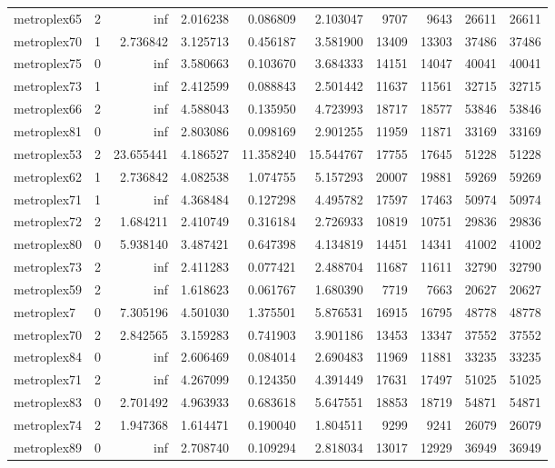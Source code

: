 \begin{longtable}{|l|r|r|r|r|r|r|r|r|r|}
metroplex65 & 2 & inf & 2.016238 & 0.086809 & 2.103047 & 9707 & 9643 & 26611 & 26611 \\
metroplex70 & 1 & 2.736842 & 3.125713 & 0.456187 & 3.581900 & 13409 & 13303 & 37486 & 37486 \\
metroplex75 & 0 & inf & 3.580663 & 0.103670 & 3.684333 & 14151 & 14047 & 40041 & 40041 \\
metroplex73 & 1 & inf & 2.412599 & 0.088843 & 2.501442 & 11637 & 11561 & 32715 & 32715 \\
metroplex66 & 2 & inf & 4.588043 & 0.135950 & 4.723993 & 18717 & 18577 & 53846 & 53846 \\
metroplex81 & 0 & inf & 2.803086 & 0.098169 & 2.901255 & 11959 & 11871 & 33169 & 33169 \\
metroplex53 & 2 & 23.655441 & 4.186527 & 11.358240 & 15.544767 & 17755 & 17645 & 51228 & 51228 \\
metroplex62 & 1 & 2.736842 & 4.082538 & 1.074755 & 5.157293 & 20007 & 19881 & 59269 & 59269 \\
metroplex71 & 1 & inf & 4.368484 & 0.127298 & 4.495782 & 17597 & 17463 & 50974 & 50974 \\
metroplex72 & 2 & 1.684211 & 2.410749 & 0.316184 & 2.726933 & 10819 & 10751 & 29836 & 29836 \\
metroplex80 & 0 & 5.938140 & 3.487421 & 0.647398 & 4.134819 & 14451 & 14341 & 41002 & 41002 \\
metroplex73 & 2 & inf & 2.411283 & 0.077421 & 2.488704 & 11687 & 11611 & 32790 & 32790 \\
metroplex59 & 2 & inf & 1.618623 & 0.061767 & 1.680390 & 7719 & 7663 & 20627 & 20627 \\
metroplex7 & 0 & 7.305196 & 4.501030 & 1.375501 & 5.876531 & 16915 & 16795 & 48778 & 48778 \\
metroplex70 & 2 & 2.842565 & 3.159283 & 0.741903 & 3.901186 & 13453 & 13347 & 37552 & 37552 \\
metroplex84 & 0 & inf & 2.606469 & 0.084014 & 2.690483 & 11969 & 11881 & 33235 & 33235 \\
metroplex71 & 2 & inf & 4.267099 & 0.124350 & 4.391449 & 17631 & 17497 & 51025 & 51025 \\
metroplex83 & 0 & 2.701492 & 4.963933 & 0.683618 & 5.647551 & 18853 & 18719 & 54871 & 54871 \\
metroplex74 & 2 & 1.947368 & 1.614471 & 0.190040 & 1.804511 & 9299 & 9241 & 26079 & 26079 \\
metroplex89 & 0 & inf & 2.708740 & 0.109294 & 2.818034 & 13017 & 12929 & 36949 & 36949 \\

\end{longtable}

